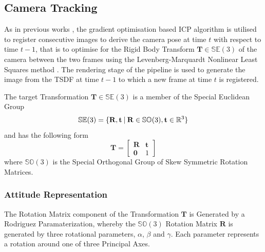\subsection{Camera Tracking}
\label{subsec:moseg_static_camera_tracking}
As in previous works \cite{Newcombe2011, Prisacariu2014}, the gradient
optimisation based ICP algorithm is utilised to register consecutive images
to derive the camera pose at time $t$ with respect to time $t-1$, that is to
optimise for the Rigid Body Transform $\mathbf{T} \in \mathbb{SE}(3)$ of the
camera between the two frames using the Levenberg-Marquardt Nonlinear Least
Squares method \cite{NumericalRecipes}. The rendering stage of the pipeline
is used to generate the image from the TSDF  at time $t-1$ to which a new frame
at time $t$ is registered.

The target Transformation $\mathbf{T} \in \mathbb{SE}(3)$ is a member of the
Special Euclidean Group
\begin{equation}
  \label{eqn:se3_definition}
  \mathbb{SE}(3) = \{\mathbf{R}, \mathbf{t} \:\vert\: \mathbf{R} \in
  \mathbb{SO}(3), \mathbf{t} \in \mathbb{R}^{3}\}
\end{equation}
and has the following form
\begin{equation}
  \label{eqn:trans_mat_definition}
  \mathbf{T} =
  \begin{bmatrix}
    \mathbf{R} & \mathbf{t} \\
    \mathbf{0} & 1
  \end{bmatrix}
\end{equation}
where $\mathbb{SO}(3)$ is the Special Orthogonal Group of Skew Symmetric
Rotation Matrices.

\subsubsection{Attitude Representation}
\label{subsub:moseg_static_camera_attitude}
The Rotation Matrix component of the Transformation $\mathbf{T}$ is
Generated by a Rodriguez Paramaterization\cite{Shuster1993}, whereby the
$\mathbb{SO}(3)$ Rotation Matrix $\mathbf{R}$ is generated by three rotational
parameters, $\alpha$, $\beta$ and $\gamma$. Each parameter represents a rotation
around one of three Principal Axes.


